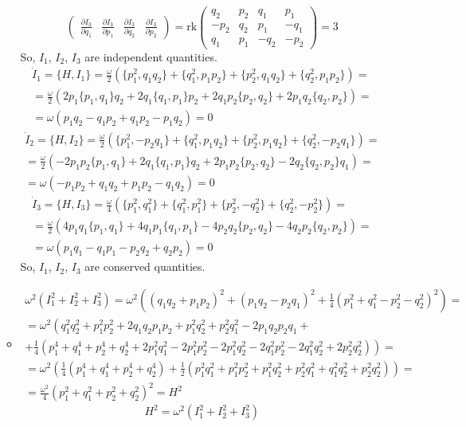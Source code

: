 \documentclass[12pt]{article}
\theoremstyle{definition}
\begin{document}
\begin{enumerate}
\begin{itemize}
\begin{equation}
\begin{pmatrix}
                \frac{\partial I_3}{\partial q_1} & \frac{\partial I_3}{\partial p_1} & \frac{\partial I_3}{\partial q_2} & \frac{\partial I_3}{\partial p_2}
            \end{pmatrix}=\text{rk}\begin{pmatrix}
                q_2 & p_2 & q_1 & p_1\\
                -p_2 & q_2 & p_1 & -q_1\\
                q_1 & p_1 & -q_2 & -p_2
            \end{pmatrix}=3
        \end{equation}
        So, $I_1$, $I_2$, $I_3$ are independent quantities.
        \begin{multline}
            \dot{I}_1=\{H,I_1\}=\frac{\omega}{2}(\{p_1^2,q_1q_2\}+\{q_1^2,p_1p_2\}+\{p_2^2,q_1q_2\}+\{q_2^2,p_1p_2\})=\\=\frac{\omega}{2}(2p_1\{p_1,q_1\}q_2+2q_1\{q_1,p_1\}p_2+2q_1p_2\{p_2,q_2\}+2p_1q_2\{q_2,p_2\})=\\=\omega(p_1q_2-q_1p_2+q_1p_2-p_1q_2)=0
        \end{multline}
        \begin{multline}
            \dot{I}_2=\{H,I_2\}=\frac{\omega}{2}(\{p_1^2,-p_2q_1\}+\{q_1^2,p_1q_2\}+\{p_2^2,p_1q_2\}+\{q_2^2,-p_2q_1\})=\\=\frac{\omega}{2}(-2p_1p_2\{p_1,q_1\}+2q_1\{q_1,p_1\}q_2+2p_1p_2\{p_2,q_2\}-2q_2\{q_2,p_2\}q_1)=\\=\omega(-p_1p_2+q_1q_2+p_1p_2-q_1q_2)=0
        \end{multline}
        \begin{multline}
            \dot{I}_3=\{H,I_3\}=\frac{\omega}{4}(\{p_1^2,q_1^2\}+\{q_1^2,p_1^2\}+\{p_2^2,-q_2^2\}+\{q_2^2,-p_2^2\})=\\=\frac{\omega}{2}(4p_1q_1\{p_1,q_1\}+4q_1p_1\{q_1,p_1\}-4p_2q_2\{p_2,q_2\}-4q_2p_2\{q_2,p_2\})=\\=\omega(p_1q_1-q_1p_1-p_2q_2+q_2p_2)=0
        \end{multline}
        So, $I_1$, $I_2$, $I_3$ are conserved quantities.
        \item
        \begin{multline}
            \omega^2(I_1^2+I_2^2+I_3^2)=\omega^2\left((q_1q_2+p_1p_2)^2+(p_1q_2-p_2q_1)^2+\frac{1}{4}(p_1^2+q_1^2-p_2^2-q_2^2)^2\right)=\\=\omega^2\left(q_1^2q_2^2+p_1^2p_2^2+2q_1q_2p_1p_2+p_1^2q_2^2+p_2^2q_1^2-2p_1q_2p_2q_1+\right.\\\left.+\frac{1}{4}(p_1^4+q_1^4+p_2^4+q_2^4+2p_1^2q_1^2-2p_1^2p_2^2-2p_1^2q_2^2-2q_1^2p_2^2-2q_1^2q_2^2+2p_2^2q_2^2)\right)=\\=\omega^2\left(\frac{1}{4}(p_1^4+q_1^4+p_2^4+q_2^4)+\frac{1}{2}(p_1^2q_1^2+p_1^2p_2^2+p_1^2q_2^2+p_2^2q_1^2+q_1^2q_2^2+p_2^2q_2^2)\right)=\\=\frac{\omega^2}{4}(p_1^2+q_1^2+p_2^2+q_2^2)^2=H^2
        \end{multline}
        \begin{equation}
            \boxed{H^2=\omega^2(I_1^2+I_2^2+I_3^2)}
        \end{equation}
    \end{itemize}
\end{enumerate}
\end{document}
